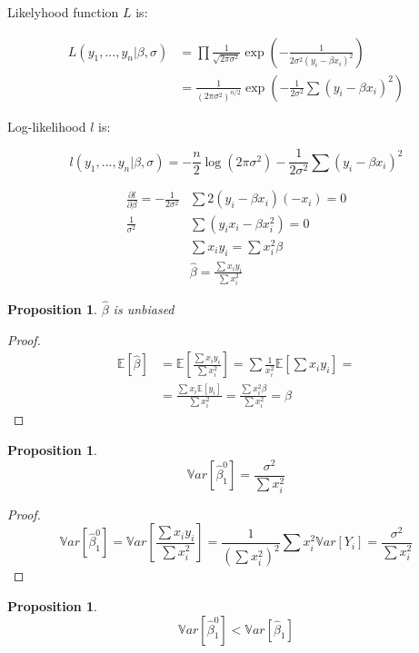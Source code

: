 \documentclass[12pt,a4paper,oneside]{book} %
\newtheorem{proposition}[theorem]{Proposition}
\begin{document}
	
	Likelyhood function $L$ is:

	\begin{align*}
		L(y_1,...,y_n | \beta, \sigma) &= \prod \frac{1}{\sqrt{2 \pi \sigma^2}} \exp(-\frac{1}{2\sigma^2 (y_i-\beta x_i)^2}) \\
		&= \frac{1}{(2\pi \sigma^2)^{n/2}}\exp(-\frac{1}{2\sigma^2} \sum (y_i-\beta x_i)^2)
	\end{align*}

	Log-likelihood $l$ is:

\[
	l(y_1,...,y_n | \beta, \sigma)=-\frac{n}{2}\log(2\pi \sigma^2)-\frac{1}{2 \sigma^2} \sum (y_i - \beta x_i)^2
\]


\begin{align*}
	\frac{\partial l}{\partial \beta} = - \frac{1}{2 \sigma^2} & \sum 2(y_i-\beta x_i)(-x_i)=0 \\
	\frac{1}{\sigma^2}& \sum (y_i x_i - \beta x_i ^2) = 0 \\
	& \sum x_i y_i =  \sum  x_i^2 \beta \\
	& \hat{\beta} = \frac{\sum x_i y_i}{\sum x_i^2}
\end{align*}


	\begin{proposition}
		$\hat{\beta}$ is unbiased
	\end{proposition}

	\begin{proof}

		\begin{align*}
			\mathbb{E} [\hat{\beta}] &= \mathbb{E} [\frac{\sum x_i y_i}{\sum x_i^2}] = \sum \frac{1}{x_i^2} \mathbb{E}[\sum x_i y_i] = \\
			&= \frac{\sum x_i\mathbb{E}[y_i]}{\sum x_i^2} = \frac{\sum x_i^2 \beta}{\sum x_i^2} = \beta 
		\end{align*}
		
	\end{proof}


	\begin{proposition}
		\[
		\mathbb{V}ar[\hat{\beta}_1^0] = \frac{\sigma^2}{\sum x_i^2}
		\]
	\end{proposition}


	\begin{proof}
		\[
		\mathbb{V}ar[\hat{\beta}_1^0] =  \mathbb{V}ar[\frac{\sum x_i y_i}{\sum x_i^2}] = \frac{1}{(\sum x_i^2)^2} \sum x_i^2 \mathbb{V}ar[Y_i] = \frac{\sigma^2}{\sum x_i^2}
		\]
	\end{proof}


	\begin{proposition}
		\[
			\mathbb{V}ar[\hat{\beta}_1^0] < \mathbb{V}ar[\hat{\beta}_1]
		\]
	\end{proposition}
\end{document}
